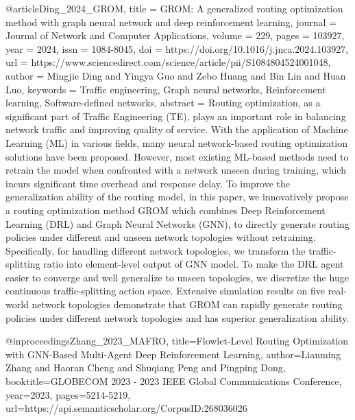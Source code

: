 {@article{Ding_2024_GROM,
title = {{GROM: A generalized routing optimization method with graph neural network and deep reinforcement learning}},
journal = {Journal of Network and Computer Applications},
volume = {229},
pages = {103927},
year = {2024},
issn = {1084-8045},
doi = {https://doi.org/10.1016/j.jnca.2024.103927},
url = {https://www.sciencedirect.com/science/article/pii/S1084804524001048},
author = {Mingjie Ding and Yingya Guo and Zebo Huang and Bin Lin and Huan Luo},
keywords = {Traffic engineering, Graph neural networks, Reinforcement learning, Software-defined networks},
abstract = {Routing optimization, as a significant part of Traffic Engineering (TE), plays an important role in balancing network traffic and improving quality of service. With the application of Machine Learning (ML) in various fields, many neural network-based routing optimization solutions have been proposed. However, most existing ML-based methods need to retrain the model when confronted with a network unseen during training, which incurs significant time overhead and response delay. To improve the generalization ability of the routing model, in this paper, we innovatively propose a routing optimization method GROM which combines Deep Reinforcement Learning (DRL) and Graph Neural Networks (GNN), to directly generate routing policies under different and unseen network topologies without retraining. Specifically, for handling different network topologies, we transform the traffic-splitting ratio into element-level output of GNN model. To make the DRL agent easier to converge and well generalize to unseen topologies, we discretize the huge continuous traffic-splitting action space. Extensive simulation results on five real-world network topologies demonstrate that GROM can rapidly generate routing policies under different network topologies and has superior generalization ability.}
}


@inproceedings{Zhang_2023_MAFRO,
  title={{Flowlet-Level Routing Optimization with GNN-Based Multi-Agent Deep Reinforcement Learning}},
  author={Lianming Zhang and Haoran Cheng and Shuqiang Peng and Pingping Dong},
  booktitle={GLOBECOM 2023 - 2023 IEEE Global Communications Conference},
  year={2023},
  pages={5214-5219},
  url={https://api.semanticscholar.org/CorpusID:268036026}
}

}
